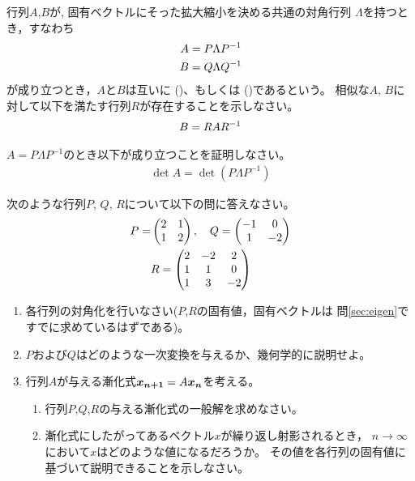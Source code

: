 \documentclass[twocolumn,11pt]{jarticle}
\begin{document}
\nquestion
行列$A$,$B$が, 固有ベクトルにそった拡大縮小を決める共通の対角行列
$\Lambda$を持つとき，すなわち
\begin{align}
  A&=P\Lambda P^{-1}\notag\\
  B&=Q\Lambda Q^{-1}\notag
\end{align}
が成り立つとき，$A$と$B$は互いに
()、もしくは
()であるという。
相似な$A$, $B$に対して以下を満たす行列$R$が存在することを示しなさい。
\begin{align}
  B=RA R^{-1}\notag
\end{align}

\nquestion
$A=P\Lambda P^{-1}$のとき以下が成り立つことを証明しなさい。
\begin{align}
  \det A=\det (P\Lambda P^{-1})
\end{align}

\exercise
次のような行列$P$, $Q$, $R$について以下の問に答えなさい。
\begin{align}
P=&\begin{pmatrix} 2 & 1\\1 & 2
  \end{pmatrix},
\quad 
Q=\begin{pmatrix} -1 & 0\\1 & -2
  \end{pmatrix}
\notag\\
&R=\begin{pmatrix} 2 & -2 & 2\\1 & 1 & 0\\1 & 3 & -2
  \end{pmatrix}\notag
\end{align}
\begin{enumerate}
\item 各行列の対角化を行いなさい($P$,$R$の固有値，固有ベクトルは
  問\ref{sec:eigen}ですでに求めているはずである)。
\item $P$および$Q$はどのような一次変換を与えるか、幾何学的に説明せよ。
\item 行列$A$が与える漸化式$\boldsymbol{x_{n+1}}=A\boldsymbol{x_{n}}$を考える。
  \begin{enumerate}
  \item 行列$P$,$Q$,$R$の与える漸化式の一般解を求めなさい。
  \item 漸化式にしたがってあるベクトル$x$が繰り返し射影されるとき，
  $n\to\infty$において$x$はどのような値になるだろうか。
  その値を各行列の固有値に基づいて説明できることを示しなさい。
  \end{enumerate}
\end{enumerate}
\end{document}

